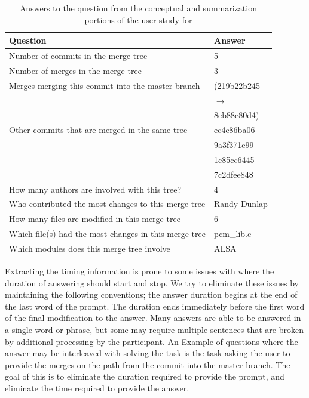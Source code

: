 \begin{table}[htpb]
  \centering
  \caption{Answers to the question from the conceptual and summarization portions of the user study for \comB}
  \label{tab:comb_study_answers}
  \begin{tabular}{l|l}
    Question & Answer \\\hline\hline
    Number of commits in the merge tree & 5 \\
    Number of merges in the merge tree & 3\\\hline
    Merges merging this commit into the master branch     & (219b22b245
    \\
    & $\rightarrow$ \\
    & 8eb88c80d4)\\
    Other commits that are merged in the same tree        & ec4e86ba06\\
    & 9a3f371e99\\
    & 1c85cc6445\\
    & 7c2dfee848\\
    How many authors are involved with this tree?         & 4\\
    Who contributed the most changes to this merge tree   & Randy Dunlap\\
    How many files are modified in this merge tree        & 6\\
    Which file(s) had the most changes in this merge tree & pcm\_lib.c\\
    Which modules does this merge tree involve            & ALSA\\
  \end{tabular}
\end{table}

Extracting the timing information is prone to some issues with where the
duration of answering should start and stop. We try to eliminate these
issues by maintaining the following conventions; the answer duration
begins at the end of the last word of the prompt. The duration ends
immediately before the first word of the final modification to the
answer. Many answers are able to be answered in a single word or phrase,
but some may require multiple sentences that are broken by additional
processing by the participant. An Example of questions where the answer
may be interleaved with solving the task is the task asking the user to
provide the merges on the path from the commit into the master branch.
The goal of this is to eliminate the duration required to provide the
prompt, and eliminate the time required to provide the answer.

